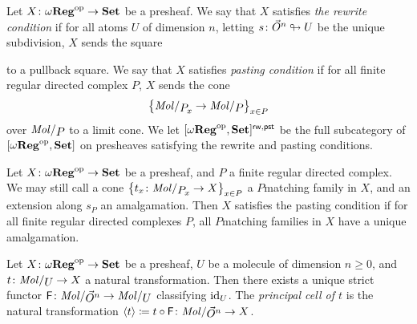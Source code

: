 \begin{dfn} 
    Let \( X \colon \omega\mathbf{Reg}^\mathrm{op} \to \mathbf{Set} \) be a presheaf. 
    We say that \( X \) satisfies \emph{the rewrite condition} if for all atoms \( U \) of dimension \( n \), letting \( s \colon \vec{O}^{n} \looparrowright U \) be the unique subdivision, \( X \) sends the square
    \begin{center}
    \end{center}
    to a pullback square.
    We say that \( X \) satisfies \emph{pasting condition} if for all finite regular directed complex \( P \), \( X \) sends the cone 
    \begin{equation*}
        \set{\molecin{\imel{P}{x}} \to \molecin{P}}_{x \in P}
    \end{equation*}
    over \( \molecin{P} \) to a limit cone.
    We let \( [\omega\mathbf{Reg}^\mathrm{op}, \mathbf{Set}]^{\mathsf{rw, pst}} \) be the full subcategory of \( [\omega\mathbf{Reg}^\mathrm{op}, \mathbf{Set}] \) on presheaves satisfying the rewrite and pasting conditions.
\end{dfn}

\begin{rmk}
    Let \( X \colon \omega\mathbf{Reg}^\mathrm{op} \to \mathbf{Set} \) be a presheaf, and \( P \) a finite regular directed complex. 
    We may still call a cone \( \set{t_x \colon \molecin{\imel{P}{x}} \to X}_{x \in P} \) a \( P \)\nbd matching family in \( X \), and an extension along \( s_P \) an amalgamation.
    Then \( X \) satisfies the pasting condition if for all finite regular directed complexes \( P \), all \( P \)\nbd matching families in \( X \) have a unique amalgamation.
\end{rmk}

\begin{dfn}
    Let \( X \colon \omega\mathbf{Reg}^\mathrm{op} \to \mathbf{Set} \) be a presheaf, \( U \) be a molecule of dimension \( n \geq 0 \), and \( t \colon \molecin{U} \to X \) a natural transformation.
    Then there exists a unique strict functor \( \F \colon \molecin{\dglobe{n}} \to \molecin{U} \) classifying \( \mathrm{id}_{U} \).
    The \emph{principal cell of \( t \)} is the natural transformation \( \pcell{t} \eqdef t \after \F \colon \molecin{\dglobe{n}} \to X \).
\end{dfn}

